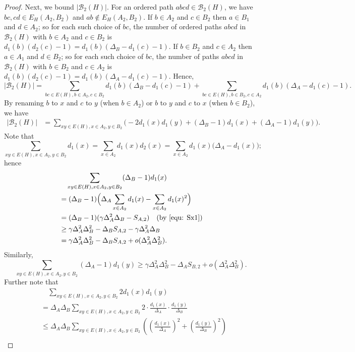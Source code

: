 \documentclass[11pt]{amsart}
\newcommand{\bb}{\mathcal{B}}
\begin{document}
\begin{proof}
Next, we bound $|\bb_2(H)|$. For an ordered path $abcd\in \bb_2(H)$, we have  $bc,cd\in E_H(A_2,B_2)$ and $ab\notin E_H(A_2,B_2)$.
If $b\in A_2$ and $c\in B_2$ then $a\in B_1$ and $d\in A_2$; so for each such choice of $bc$, the number of  ordered paths $abcd$  in $\bb_2(H)$ with $b\in A_2$ and $c\in B_2$ is $d_1(b)(d_2(c)-1)=d_1(b)(\Delta_B-d_1(c)-1)$. If $b\in B_2$ and $c\in A_2$ then $a\in A_1$ and $d\in B_2$; so for each such choice of $bc$, the number of paths $abcd$ in $\bb_2(H)$ with $b\in B_2$ and  $c\in A_2$ is $d_1(b)(d_2(c)-1)=d_1(b)(\Delta_A-d_1(c)-1)$.
Hence, 
\[|\bb_2(H)|=\sum_{bc\in E(H), b\in A_2, c\in B_2}d_1(b)(\Delta_B-d_1(c)-1)+ \sum_{bc\in E(H), b\in B_2,c\in A_2}d_1(b)(\Delta_A-d_1(c)-1).\]
By renaming $b$ to $x$ and $c$ to $y$ (when $b\in A_2$) or $b$ to $y$ and $c$ to $x$ (when $b\in B_2$), we have  
    \begin{align*}\label{eqB2}
        |\bb_2(H)|
        &= \sum_{xy\in E(H), x\in A_2, y\in B_2}\Big(-2d_1(x)d_1(y)+ (\Delta_B -1 )d_1(x)+ (\Delta_A -1)d_1(y) \Big).
    \end{align*}
    Note that 
    $$\sum_{xy\in E(H), x\in A_2, y\in B_2} d_1(x)= \sum_{x\in A_2} d_1(x)d_2(x)=\sum_{x\in A_2}d_1(x)\Big(\Delta_A-d_1(x)\Big);$$
    hence
    \begin{align*}
     & \quad \sum_{xy\in E(H), x\in A_2,y\in B_2}(\Delta_B-1)d_1(x)\\
     &=(\Delta_B-1)\Big(\Delta_A\sum_{x\in A_2}d_1(x)-\sum_{x\in A_2}d_1(x)^2\Big)\\
     & =
     (\Delta_B -1 )( \gamma \Delta_A^2\Delta_B-S_{A,2}) \quad (\mbox{by } \eqref{equ: Sx1})\\
     & \ge \gamma \Delta_A^2\Delta_B^2-\Delta_B S_{A,2} -\gamma \Delta_A^2\Delta_B\\ &=\gamma \Delta_A^2\Delta_B^2-\Delta_B S_{A,2}+o(\Delta_A^2\Delta_B^2). 
   \end{align*}  
    Similarly, 
    $$\sum_{xy\in E(H),x\in A_2,y\in B_2}(\Delta_A-1) d_1(y)\ge  \gamma \Delta_A^2\Delta_B^2-\Delta_A S_{B,2}+o(\Delta_A^2\Delta_B^2) .$$
    Further note that 
     \begin{align*}
    &\quad \sum_{xy \in E(H),x\in A_2,y\in B_2} 2d_1(x)d_1(y) \\
    &=\Delta_A\Delta_B\sum_{xy \in E(H),x\in A_2,y\in B_2} 2\cdot \frac{d_1(x)}{\Delta_A}\cdot \frac{d_1(y)}{\Delta_B} \\   
    &\le \Delta_A\Delta_B\sum_{xy \in E(H),x\in A_2,y\in B_2}  \left(\left(\frac{d_1(x)}{\Delta_A}\right)^2+\left(\frac{d_1(y)}{\Delta_B}\right)^2\right)\\

\end{align*}
\end{proof}
\end{document}
